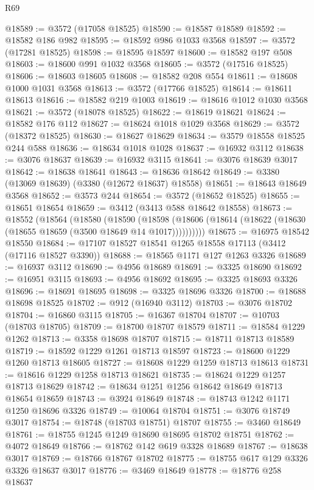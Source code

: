 \begin{lexlean}{R69}
\begin{coremodule}
@18589 := @3572 (@17058 @18525)
@18590 := @18587 @18589
@18592 := @18582 @186 @982
@18595 := @18592 @986 @1033 @3568
@18597 := @3572 (@17281 @18525)
@18598 := @18595 @18597
@18600 := @18582 @197 @508
@18603 := @18600 @991 @1032 @3568
@18605 := @3572 (@17516 @18525)
@18606 := @18603 @18605
@18608 := @18582 @208 @554
@18611 := @18608 @1000 @1031 @3568
@18613 := @3572 (@17766 @18525)
@18614 := @18611 @18613
@18616 := @18582 @219 @1003
@18619 := @18616 @1012 @1030 @3568
@18621 := @3572 (@18078 @18525)
@18622 := @18619 @18621
@18624 := @18582 @176 @112
@18627 := @18624 @1018 @1029 @3568
@18629 := @3572 (@18372 @18525)
@18630 := @18627 @18629
@18634 := @3579 @18558 @18525 @244 @588
@18636 := @18634 @1018 @1028
@18637 := @16932 @3112
@18638 := @3076 @18637
@18639 := @16932 @3115
@18641 := @3076 @18639 @3017
@18642 := @18638 @18641
@18643 := @18636 @18642
@18649 := @3380 (@13069 @18639) (@3380 (@12672 @18637) @18558)
@18651 := @18643 @18649 @3568
@18652 := @3573 @244
@18654 := @3572 (@18652 @18525)
@18655 := @18651 @18654
@18659 := @3412 (@3413 @588 @18642 @18558)
@18673 := @18552
    (@18564
      (@18580
        (@18590
          (@18598 (@18606 (@18614 (@18622 (@18630 (@18655 @18659 (@3500 @18649 @14 @1017))))))))))
@18675 := @16975 @18542 @18550
@18684 := @17107 @18527 @18541 @1265 @18558 @17113 (@3412 (@17116 @18527 @3390))
@18688 := @18565 @1171 @127 @1263 @3326
@18689 := @16937 @3112
@18690 := @4956 @18689
@18691 := @3325 @18690
@18692 := @16951 @3115
@18693 := @4956 @18692
@18695 := @3325 @18693 @3326
@18696 := @18691 @18695
@18698 := @3325 @18696 @3326
@18700 := @18688 @18698 @18525
@18702 := @912 (@16940 @3112)
@18703 := @3076 @18702
@18704 := @16860 @3115
@18705 := @16367 @18704
@18707 := @10703 (@18703 @18705)
@18709 := @18700 @18707 @18579
@18711 := @18584 @1229 @1262
@18713 := @3358 @18698 @18707
@18715 := @18711 @18713 @18589
@18719 := @18592 @1229 @1261 @18713 @18597
@18723 := @18600 @1229 @1260 @18713 @18605
@18727 := @18608 @1229 @1259 @18713 @18613
@18731 := @18616 @1229 @1258 @18713 @18621
@18735 := @18624 @1229 @1257 @18713 @18629
@18742 := @18634 @1251 @1256 @18642 @18649 @18713 @18654 @18659
@18743 := @3924 @18649
@18748 := @18743 @1242 @1171 @1250 @18696 @3326
@18749 := @10064 @18704
@18751 := @3076 @18749 @3017
@18754 := @18748 (@18703 @18751) @18707
@18755 := @3460 @18649
@18761 := @18755 @1245 @1249 @18690 @18695 @18702 @18751
@18762 := @4072 @18649
@18766 := @18762 @142 @619 @3328 @18689
@18767 := @18638 @3017
@18769 := @18766 @18767 @18702
@18775 := @18755 @617 @129 @3326 @3326 @18637 @3017
@18776 := @3469 @18649
@18778 := @18776 @258 @18637

\end{coremodule}
\end{lexlean}
